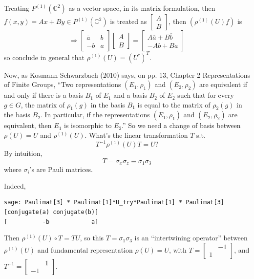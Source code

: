 Treating $P^{(1)}(\mathbb{C}^2)$ as a vector space, in its matrix formulation, then $f(x,y) = Ax+By \in P^{(1)}(\mathbb{C}^2)$ is treated as $\left[ \begin{matrix} A \\ B \end{matrix} \right]$, then $(\rho^{(1)}(U)f)$ is 
\[
\Longrightarrow \left[ \begin{matrix} \overline{a} & \overline{b} \\ -b & a \end{matrix} \right]\left[ \begin{matrix} A \\ B \end{matrix} \right] = \left[ \begin{matrix} A\overline{a} + B\overline{b}  \\ -Ab + Ba \end{matrix} \right]
\]
so conclude in general that $\rho^{(1)}(U) = (U^{\dag})^T$.  

Now, as Kosmann-Schwarzbach (2010) \cite{dgdt:YKosmann-Schwarzbach2010} says, on pp. 13, Chapter 2 Representations of Finite Groups, ``Two representations $(E_1,\rho_1)$ and $(E_2,\rho_2)$ are equivalent if and only if there is a basis $B_1$ of $E_1$ and a basis $B_2$ of $E_2$ such that for every $g\in G$, the matrix of $\rho_1(g)$ in the basis $B_1$ is equal to the matrix of $\rho_2(g)$ in the basis $B_2$.  In particular, if the representations $(E_1,\rho_1)$ and $(E_2,\rho_2)$ are equivalent, then $E_1$ is isomorphic to $E_2$.''  So we need a change of basis between $\rho(U) = U$ and $\rho^{(1)}(U)$.  What's the linear transformation $T$ s.t.
\[
T^{-1} \rho^{(1)}(U) T = U ?
\]  
By intuition, 
\[
T = \sigma_x \sigma_z \equiv \sigma_1 \sigma_3
\]
where $\sigma_i$'s are Pauli matrices.  

Indeed, 
\begin{lstlisting}
sage: Paulimat[3] * Paulimat[1]*U_try*Paulimat[1] * Paulimat[3]
[conjugate(a) conjugate(b)]
[          -b            a]
\end{lstlisting}

Then $\rho^{(1)}(U)\circ T = TU$, so this $T = \sigma_1 \sigma_3$ is an ``intertwining operator'' between $\rho^{(1)}(U)$ and fundamental representation $\rho(U) = U$, with $T = \left[ \begin{matrix} & - 1 \\
1 & \end{matrix} \right]$, and $T^{-1} = \left[ \begin{matrix} & 1 \\ -1 & \end{matrix} \right]$.  

